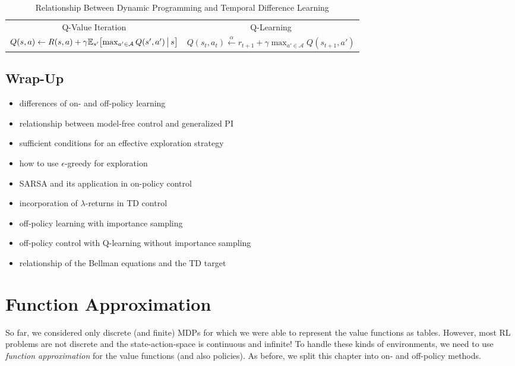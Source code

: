 \begin{table}
\begin{tabular}{c|c}
				                                            Q-Value Iteration                                             &                                               Q-Learning                                                \\
				\( Q(s, a) \gets R(s, a) + \gamma \mathbb{E}_{s'}\bigl[ \max_{a' \in \mathcal{A}} Q(s', a') \,\big\vert\, s \bigr] \) & \( Q(s_t, a_t) \overset{\alpha}{\gets} r_{t + 1} + \gamma \max_{a' \in \mathcal{A}} Q(s_{t + 1}, a') \) \\ \bottomrule
			\end{tabular}
			\caption{Relationship Between Dynamic Programming and Temporal Difference Learning}
			\label{fig:dpTdRelationship}
		\end{table}

	\section{Wrap-Up} %
		\begin{itemize}
			\item differences of on- and off-policy learning
			\item relationship between model-free control and generalized \ac{PI}
			\item sufficient conditions for an effective exploration strategy
			\item how to use \(\epsilon\)-greedy for exploration
			\item \ac{SARSA} and its application in on-policy control
			\item incorporation of \(\lambda\)-returns in \ac{TD} control
			\item off-policy learning with importance sampling
			\item off-policy control with Q-learning without importance sampling
			\item relationship of the Bellman equations and the \ac{TD} target
		\end{itemize}

\chapter{Function Approximation}
	So far, we considered only discrete (and finite) \acp{MDP} for which we were able to represent the value functions as tables. However, most \ac{RL} problems are not discrete and the state-action-space is continuous and infinite! To handle these kinds of environments, we need to use \emph{function approximation} for the value functions (and also policies). As before, we split this chapter into on- and off-policy methods.

